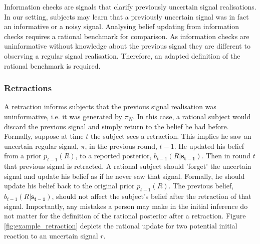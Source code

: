\documentclass{article}
\begin{document}
Information checks are signals that clarify previously uncertain signal realisations. In our setting, subjects may learn that a previously uncertain signal was in fact an informative or a noisy signal. Analysing belief updating from information checks requires a rational benchmark for comparison. As information checks are uninformative without knowledge about the previous signal they are different to observing a regular signal realisation. Therefore, an adapted definition of the rational benchmark is required. 

\subsubsection*{Retractions}
A retraction informs subjects that the previous signal realisation was uninformative, i.e. it was generated by $\pi_N$. In this case, a rational subject would discard the previous signal and simply return to the belief he had before. Formally, suppose at time $t$ the subject sees a retraction. This implies he saw an uncertain regular signal, $\pi$, in the previous round, $t-1$. He updated his belief from a prior $p_{t-1}(R)$, to a reported posterior, $b_{t-1}(R|\mathbf{s_{t-1}})$. Then in round $t$ that previous signal is retracted. A rational subject should 'forget' the uncertain signal and update his belief as if he never saw that signal. Formally, he should update his belief back to the original prior $p_{t-1}(R)$. The previous belief, $b_{t-1}(R|\mathbf{s_{t-1}})$, should not affect the subject's belief after the retraction of that signal. Importantly, any mistakes a person may make in the initial inference do not matter for the definition of the rational posterior after a retraction. Figure \ref{fig:example_retraction} depicts the rational update for two potential initial reaction to an uncertain signal $r$.
\end{document}
